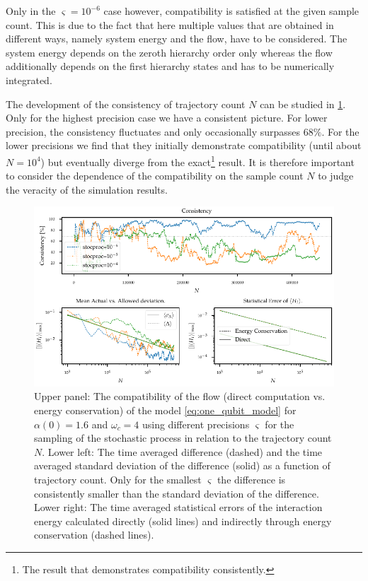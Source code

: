 Only in the \(\varsigma=10^{-6}\) case however, compatibility is
satisfied at the given sample count. This is due to the fact that here
multiple values that are obtained in different ways, namely system
energy and the flow, have to be considered. The system energy depends
on the zeroth hierarchy order only whereas the flow additionally
depends on the first hierarchy states and has to be numerically
integrated.

The development of the consistency of trajectory count \(N\) can be
studied in \cref{fig:stocproc_consistency_dev}. Only for the highest
precision case we have a consistent picture. For lower precision, the
consistency fluctuates and only occasionally surpasses \(68\%\). For
the lower precisions we find that they initially demonstrate
compatibility (until about \(N=10^4\)) but eventually diverge from the
exact\footnote{The result that demonstrates compatibility
  consistently.} result. It is therefore important to consider the
dependence of the compatibility on the sample count \(N\) to judge the
veracity of the simulation results.
\begin{figure}[p]
  \centering
  \includegraphics{figs/one_bath_syst/stocproc_systematics_consistency}
  \caption{\label{fig:stocproc_consistency_dev} Upper panel: The
    compatibility of the flow (direct computation vs. energy
    conservation) of the model \cref{eq:one_qubit_model} for
    \(α(0)=1.6\) and \(ω_c=4\) using different precisions
    \(\varsigma\) for the sampling of the stochastic process in
    relation to the trajectory count \(N\). Lower left: The time
    averaged difference (dashed) and the time averaged standard
    deviation of the difference (solid) as a function of trajectory
    count. Only for the smallest \(\varsigma\) the difference is
    consistently smaller than the standard deviation of the
    difference. Lower right: The time averaged statistical errors of the interaction
    energy calculated directly (solid lines) and indirectly through
    energy conservation (dashed lines).}
\end{figure}

